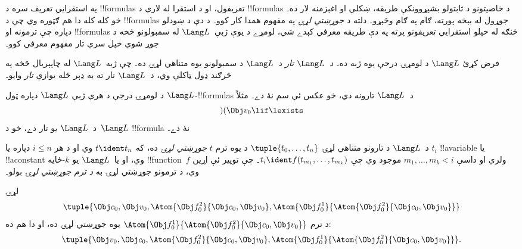 \documentclass[../../../include/open-logic-section]{subfiles}
\begin{document}


په استقرايي تعريف سره د !!{formula}s تعريفول، او د استقرا له لارې د
!!{formula}s د خاصيتونو د ثابتولو بشپړوونکې طريقه، ښکلې او اغېزمنه لار
ده۔ خو کله کله دا هم ګټوره وي چې د !!{formula}s جوړول له بېخه پورته،
ګام په ګام وڅېړو۔ دلته د \emph{جوړښتي لړۍ} په مفهوم همدا کار کوو۔
%
د دې د ښودلو دپاره چې ترمونه او !!{formula}s څنګه له خپلو استقرايي
تعريفونو پرته په دې طريقه معرفي کېدے شي، لومړے د يوې ژبې~$\Lang L$
له سمبولونو څخه د جوړ شوي خپل سري تار مفهوم معرفي کوو۔

\begin{defn}[تارونه]
فرض کړئ $\Lang L$ د لومړۍ درجې يوه ژبه ده۔ \emph{د~$\Lang L$ تار}
د~$\Lang L$ د سمبولونو يوه متناهي لړۍ ده۔ چې ژبه~$\Lang L$ له
چاپېريال څخه په څرګند ډول ټاکلې وي، د~$\Lang L$ تار ته به ډېر ځله
يوازې \emph{تار} وايو۔
\end{defn}

\begin{ex}
د لومړۍ درجې د هرې ژبې $\Lang L$ دپاره ټول
$\Lang L$-!!{formula}s د~$\Lang L$ تارونه دي، خو عکس ئې سم نۀ دے۔
مثلاً \[)(\Obj v_0\lif\lexists\] د~$\Lang L$ يو تار دے، خو د~$\Lang L$
!!{formula} نۀ دے۔
\end{ex}

\begin{defn}
د~$\Lang L$ د تارونو متناهي لړۍ $\tuple{t_0,\dotsc,t_n}$ د يوه
ترم $t$ \emph{جوړښتي لړۍ} ده، که $t \ident t_n$ وي او د هر $i \leq
n$ دپاره يا $t_i$ !!a{variable} يا !!a{constant} وي، او يا~$\Lang L$
يو $k$-ځايه !!{function}~$f$ ولري او داسې $m_1,\dotsc,m_k < i$
موجود وي چې $t_i \ident f(t_{m_1},\dotsc,t_{m_k})$۔ چې توپير ئې اړين
وي، د ترمونو جوړښتي لړۍ به \emph{د ترم جوړښتي لړۍ} بولو۔
\end{defn}

\begin{ex}
لړۍ
\[
    \tuple{\Obj c_0, \Obj v_0, \Atom{\Obj f^2_0}{\Obj c_0, \Obj v_0}, \Atom{\Obj f^1_0}{\Atom{\Obj f^2_0}{\Obj c_0, \Obj v_0}}}
\]
د ترم $\Atom{\Obj f^1_0}{\Atom{\Obj f^2_0}{\Obj c_0, \Obj v_0}}$
يوه جوړښتي لړۍ ده، او دا هم ده:
\[
    \tuple{\Obj v_0, \Obj c_0, \Atom{\Obj f^2_0}{\Obj c_0, \Obj v_0}, \Atom{\Obj f^1_0}{\Atom{\Obj f^2_0}{\Obj c_0, \Obj v_0}}}.
\]
\end{ex}
\end{document}
